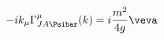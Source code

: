 \begin{equation}
\label{eq:lhszwo}
-ik_\mu\Gamma_{JA\smash[t]{\Psibar}}^\mu(k)=i\frac{m^2}{4g}\veva
\end{equation}

